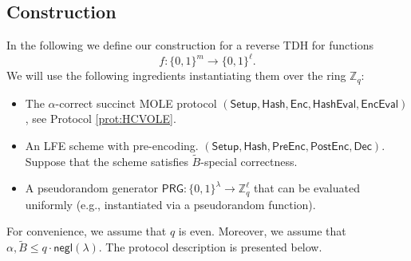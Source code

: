 \documentclass{article}
\newcommand{\Pre}{\mathsf{Pre}}
\newcommand{\Post}{\mathsf{Post}}
\newcommand{\Z}{\mathbb{Z}}
\newcommand{\negl}{\mathsf{negl}}
\renewcommand{\sec}{\ensuremath{\lambda}}
\newcommand{\algofont}[1]{\ensuremath{\mathsf{#1}}}
\newcommand{\Enc}{{\algofont{Enc}}}
\newcommand{\Dec}{{\algofont{Dec}}}
\newcommand{\Setup}{{\algofont{Setup}}}
\newcommand{\Eval}{\algofont{Eval}\xspace}
\newcommand{\Hash}{{\algofont{Hash}}}
\begin{document}
\subsection{Construction}

In the following we define our construction for a reverse TDH for functions
\[
f: \{0,1\}^m \to \{0,1\}^\ell.
\]
We will use the following ingredients instantiating them over the ring $\Z_q$:
\begin{itemize}
    \item The $\alpha$-correct succinct MOLE protocol
     $(\Setup, \Hash, \Enc, \Hash\Eval, \Enc\Eval)$, see Protocol \ref{prot:HCVOLE}.
    \item An LFE scheme with pre-encoding.
     $(\Setup, \Hash, \Pre\Enc, \Post\Enc, \Dec)$. Suppose that the scheme satisfies $\widetilde{B}$-special correctness.
   \item A pseudorandom generator $\mathsf{PRG}:\{0, 1\}^\sec\rightarrow \Z_q^{\ell}$ that can be evaluated uniformly (e.g., instantiated via a pseudorandom function).
\end{itemize}
For convenience, we assume that $q$ is even. Moreover, we assume that $\alpha, \widetilde{B}\le q\cdot\negl(\sec)$. The protocol description is presented below.
\end{document}
